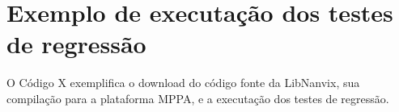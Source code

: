 

\section{Exemplo de executação dos testes de regressão}
\label{sec:code-example}

O Código X exemplifica o download do código fonte da LibNanvix, sua compilação para a plataforma MPPA, e a executação dos testes de regressão.

    

